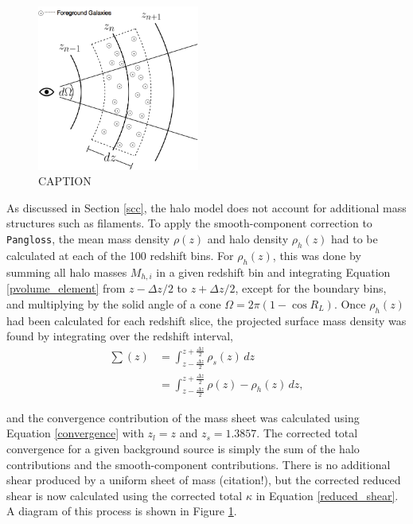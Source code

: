 \documentclass[%
 reprint,
 amsmath,amssymb,
 aps,nofootinbib
]{revtex4-1}
\begin{document}
\begin{figure}
    \centering
    \includegraphics[width=0.475\textwidth]{figs-swe/thesis/smooth_correction.png}
    \captionsetup{justification=raggedright,singlelinecheck=false}
    \caption{CAPTION}
    \label{fig:scc}
\end{figure}

As discussed in Section \ref{scc}, the halo model does not account for additional mass structures such as filaments. To apply the smooth-component correction to \texttt{Pangloss}, the mean mass density $\rho(z)$ and halo density $\rho_h(z)$ had to be calculated at each of the 100 redshift bins. For $\rho_h(z)$, this was done by summing all halo masses $M_{h,i}$ in a given redshift bin and integrating Equation \eqref{pvolume_element} from ${z-\Delta z/2}$ to ${z+\Delta z/2}$, except for the boundary bins, and multiplying by the solid angle of a cone ${\Omega=2\pi(1-\cos R_L)}$. Once $\rho_h(z)$ had been calculated for each redshift slice, the projected surface mass density was found by integrating over the redshift interval,
\begin{align}\label{surface_density} 
\sum(z)&=\int_{z-\frac{\Delta z}{2}}^{z+\frac{\Delta z}{2}} \rho_s(z)\,dz\nonumber\\
&=\int_{z-\frac{\Delta z}{2}}^{z+\frac{\Delta z}{2}} \rho(z)-\rho_h(z)\,dz,
\end{align}

\noindent and the convergence contribution of the mass sheet was calculated using Equation \eqref{convergence} with ${z_l=z}$ and ${z_s=1.3857}$. The corrected total convergence for a given background source is simply the sum of the halo contributions and the smooth-component contributions. There is no additional shear produced by a uniform sheet of mass (citation!), but the corrected reduced shear is now calculated using the corrected total $\kappa$ in Equation \eqref{reduced_shear}. A diagram of this process is shown in Figure \ref{fig:scc}.
\end{document}
